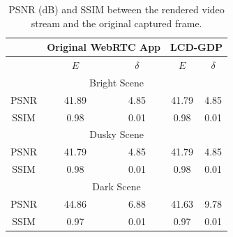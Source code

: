

\begin{table}[t]
	\footnotesize
	\centering
	\caption{PSNR (dB) and SSIM between the rendered video stream and the original captured frame.}
	\begin{tabular}{|c||c|c||c|c|}
		\hline
		& \multicolumn{2}{|c||}{Original WebRTC App} & \multicolumn{2}{|c|}{LCD-GDP} \\ \hline
		& $E$ & $\delta$ & $E$ & $\delta$ \\ \hline
		\multicolumn{5}{|c|}{Bright Scene} \\ \hline
		PSNR & 41.89 & 4.85 & 41.79 & 4.85 \\ \hline
		SSIM & 0.98 & 0.01  & 0.98 & 0.01 \\ \hline
		\multicolumn{5}{|c|}{Dusky Scene} \\ \hline
		PSNR & 41.79 & 4.85  & 41.79 & 4.85 \\ \hline
		SSIM & 0.98 & 0.01  & 0.98 & 0.01 \\ \hline
		\multicolumn{5}{|c|}{Dark Scene} \\ \hline
		PSNR & 44.86 & 6.88  & 41.63 & 9.78 \\ \hline
		SSIM & 0.97 & 0.01  & 0.97 & 0.01 \\ \hline
	\end{tabular}
	\label{tab:distortion}
        \vspace{-18pt}  
\end{table}




